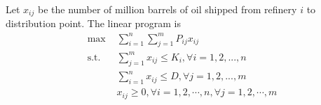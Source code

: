 \documentclass[14pt]{article}
\begin{document}
\begin{enumerate}
\begin{enumerate}
                    Let $x_{ij}$ be the number of million barrels of oil shipped from refinery $i$ to distribution point. The linear program is
                    \begin{align*}
                        \text{max }  & \sum_{i=1}^n\sum_{j=1}^mP_{ij}x_{ij}                              \\
                        \text{s.t. } & \sum_{j=1}^mx_{ij} \leq K_i, \forall i = 1,2,...,n                \\
                                     & \sum_{i=1}^nx_{ij} \leq D , \forall j = 1,2,...,m                 \\
                                     & x_{ij} \geq 0, \forall i = 1,2,\cdots,n, \forall j = 1,2,\cdots,m
                    \end{align*}
          \end{enumerate}
\end{enumerate}
\end{document}
